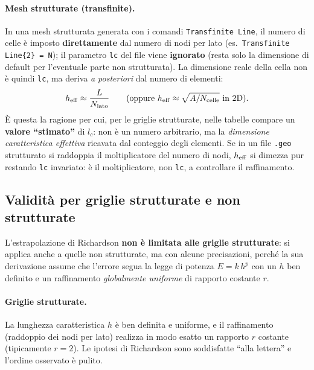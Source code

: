 \paragraph{Mesh strutturate (transfinite).} In una mesh strutturata generata con i comandi
\texttt{Transfinite Line}, il numero di celle è imposto \textbf{direttamente} dal numero di nodi
per lato (es.\ \texttt{Transfinite Line\{2\} = N}); il parametro \texttt{lc} del file viene
\textbf{ignorato} (resta solo la dimensione di default per l'eventuale parte non strutturata). La
dimensione reale della cella non è quindi \texttt{lc}, ma deriva \emph{a posteriori} dal numero di
elementi:
\begin{equation}
  h_{\rm eff} \approx \frac{L}{N_{\rm lato}} \qquad\text{(oppure } h_{\rm eff} \approx \sqrt{A/N_{\rm celle}} \text{ in 2D)}.
  \label{eq:lc_eff}
\end{equation}
È questa la ragione per cui, per le griglie strutturate, nelle tabelle compare un \textbf{valore
``stimato''} di $l_c$: non è un numero arbitrario, ma la \emph{dimensione caratteristica effettiva}
ricavata dal conteggio degli elementi. Se in un file \texttt{.geo} strutturato si raddoppia il
moltiplicatore del numero di nodi, $h_{\rm eff}$ si dimezza pur restando \texttt{lc} invariato:
è il moltiplicatore, non \texttt{lc}, a controllare il raffinamento.

\subsection{Validità per griglie strutturate e non strutturate}
\label{subsec:richardson_strutt}

L'estrapolazione di Richardson \textbf{non è limitata alle griglie strutturate}: si applica anche
a quelle non strutturate, ma con alcune precisazioni, perché la sua derivazione assume che
l'errore segua la legge di potenza $E = k\,h^p$ con un $h$ ben definito e un raffinamento
\emph{globalmente uniforme} di rapporto costante $r$.

\paragraph{Griglie strutturate.} La lunghezza caratteristica $h$ è ben definita e uniforme, e il
raffinamento (raddoppio dei nodi per lato) realizza in modo esatto un rapporto $r$ costante
(tipicamente $r=2$). Le ipotesi di Richardson sono soddisfatte ``alla lettera'' e l'ordine
osservato è pulito.

